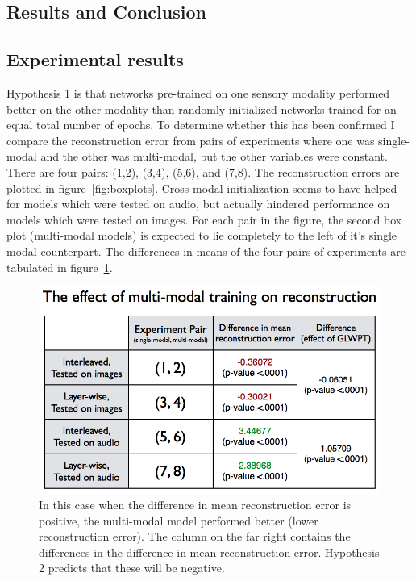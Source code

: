 \documentclass[12pt]{article}
\begin{document}
\begin{doublespacing}
\section{Results and Conclusion}
	\subsection{Experimental results}
	Hypothesis 1 is that networks pre-trained on one sensory modality performed better on the other modality than randomly initialized networks trained for an equal total number of epochs. To determine whether this has been confirmed I compare the reconstruction error from pairs of experiments where one was single-modal and the other was multi-modal, but the other variables were constant. There are four pairs: (1,2), (3,4), (5,6), and (7,8). The reconstruction errors are plotted in figure~\ref{fig:boxplots}. Cross modal initialization seems to have helped for models which were tested on audio, but actually hindered performance on models which were tested on images. For each pair in the figure, the second box plot (multi-modal models) is expected to lie completely to the left of it's single modal counterpart. The differences in means of the four pairs of experiments are tabulated in figure~\ref{fig:hypo1table}. 
	
\begin{figure}[p]
\centering
\includegraphics[width=6in]{hypo1table}
\caption{In this case when the difference in mean reconstruction error is positive, the multi-modal model performed better (lower reconstruction error). The column on the far right contains the differences in the difference in mean reconstruction error. Hypothesis 2 predicts that these will be negative. }
\label{fig:hypo1table}
\end{figure}


\end{doublespacing}
\end{document}
